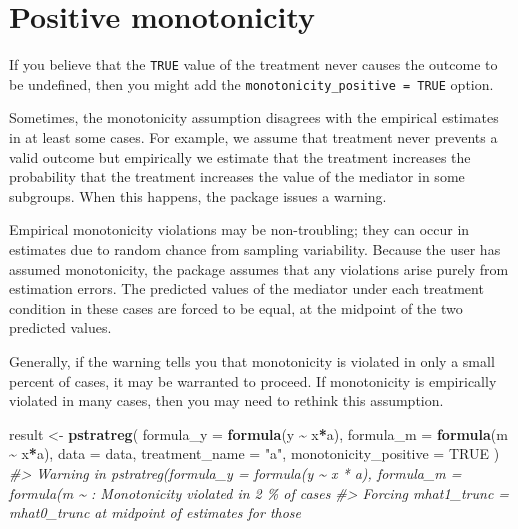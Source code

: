 \documentclass[
]{book}
\newenvironment{Shaded}{\begin{snugshade}}{\end{snugshade}}
\newcommand{\AttributeTok}[1]{\textcolor[rgb]{0.13,0.29,0.53}{#1}}
\newcommand{\CommentTok}[1]{\textcolor[rgb]{0.56,0.35,0.01}{\textit{#1}}}
\newcommand{\ConstantTok}[1]{\textcolor[rgb]{0.56,0.35,0.01}{#1}}
\newcommand{\FunctionTok}[1]{\textcolor[rgb]{0.13,0.29,0.53}{\textbf{#1}}}
\newcommand{\NormalTok}[1]{#1}
\newcommand{\OtherTok}[1]{\textcolor[rgb]{0.56,0.35,0.01}{#1}}
\newcommand{\SpecialCharTok}[1]{\textcolor[rgb]{0.81,0.36,0.00}{\textbf{#1}}}
\newcommand{\StringTok}[1]{\textcolor[rgb]{0.31,0.60,0.02}{#1}}
\begin{document}
\hypertarget{positive-monotonicity}{%
\section{Positive monotonicity}\label{positive-monotonicity}}

If you believe that the \texttt{TRUE} value of the treatment never causes the outcome to be undefined, then you might add the \texttt{monotonicity\_positive\ =\ TRUE} option.

Sometimes, the monotonicity assumption disagrees with the empirical estimates in at least some cases. For example, we assume that treatment never prevents a valid outcome but empirically we estimate that the treatment increases the probability that the treatment increases the value of the mediator in some subgroups. When this happens, the package issues a warning.

Empirical monotonicity violations may be non-troubling; they can occur in estimates due to random chance from sampling variability. Because the user has assumed monotonicity, the package assumes that any violations arise purely from estimation errors. The predicted values of the mediator under each treatment condition in these cases are forced to be equal, at the midpoint of the two predicted values.

Generally, if the warning tells you that monotonicity is violated in only a small percent of cases, it may be warranted to proceed. If monotonicity is empirically violated in many cases, then you may need to rethink this assumption.

\begin{Shaded}
\begin{Highlighting}[]
\NormalTok{result }\OtherTok{\textless{}{-}} \FunctionTok{pstratreg}\NormalTok{(}
  \AttributeTok{formula\_y =} \FunctionTok{formula}\NormalTok{(y }\SpecialCharTok{\textasciitilde{}}\NormalTok{ x}\SpecialCharTok{*}\NormalTok{a),}
  \AttributeTok{formula\_m =} \FunctionTok{formula}\NormalTok{(m }\SpecialCharTok{\textasciitilde{}}\NormalTok{ x}\SpecialCharTok{*}\NormalTok{a),}
  \AttributeTok{data =}\NormalTok{ data,}
  \AttributeTok{treatment\_name =} \StringTok{"a"}\NormalTok{,}
  \AttributeTok{monotonicity\_positive =} \ConstantTok{TRUE}
\NormalTok{)}
\CommentTok{\#\textgreater{} Warning in pstratreg(formula\_y = formula(y \textasciitilde{} x * a), formula\_m = formula(m \textasciitilde{} : Monotonicity violated in 2 \% of cases}
\CommentTok{\#\textgreater{} Forcing mhat1\_trunc = mhat0\_trunc at midpoint of estimates for those}
\end{Highlighting}
\end{Shaded}
\end{document}

